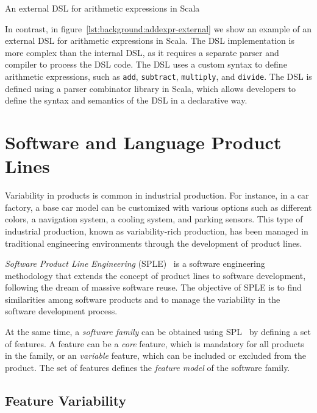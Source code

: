 \begin{Listing}[t]
    \centering
    \caption{An external DSL for arithmetic expressions in Scala}
    \label{lst:background:addexpr-external}
\end{Listing}

In contrast, in figure~\ref{lst:background:addexpr-external} we show an example of an external DSL for arithmetic expressions in Scala. The DSL implementation is more complex than the internal DSL, as it requires a separate parser and compiler to process the DSL code. The DSL uses a custom syntax to define arithmetic expressions, such as \texttt{add}, \texttt{subtract}, \texttt{multiply}, and \texttt{divide}. The DSL is defined using a parser combinator library in Scala, which allows developers to define the syntax and semantics of the DSL in a declarative way.

\section{Software and Language Product Lines}\label{sec:background:SoftwareAndLanguageProductLines}

Variability in products is common in industrial production. For instance, in a car factory, a base car model can be customized with various options such as different colors, a navigation system, a cooling system, and parking sensors. This type of industrial production, known as variability-rich production, has been managed in traditional engineering environments through the development of product lines.

\textit{Software Product Line Engineering} (SPLE)~\cite{Van01, Van07} is a software engineering methodology that extends the concept of product lines to software development, following the dream of massive software reuse. The objective of SPLE is to find similarities among software products and to manage the variability in the software development process.

At the same time, a \textit{software family} can be obtained using SPL~\cite{Clements01} by defining a set of features. A feature can be a \textit{core} feature, which is mandatory for all products in the family, or an \textit{variable} feature, which can be included or excluded from the product. The set of features defines the \textit{feature model} of the software family.

\subsection{Feature Variability}\label{subsec:background:FeatureVariabilityInSPL}

